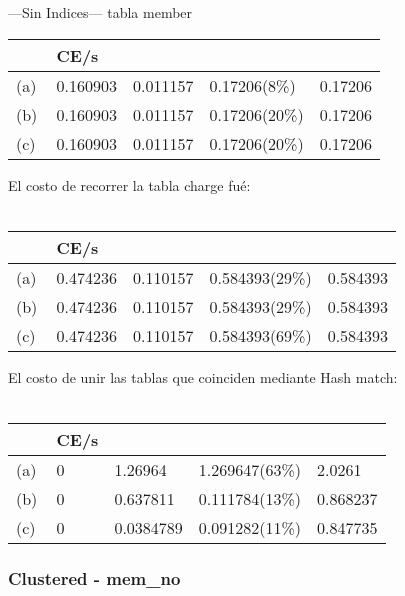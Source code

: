  ---Sin Indices---
 tabla member
\begin{tabular}{| L | L | L | L | L |}
    \hline
     & CE/s &  &  &  \\ \hline
    (a) & 0.160903 & 0.011157 & 0.17206(8\%) & 0.17206 \\ \hline
    (b) & 0.160903 & 0.011157 & 0.17206(20\%) & 0.17206 \\ \hline
    (c) & 0.160903 & 0.011157 & 0.17206(20\%) & 0.17206 \\ \hline
\end{tabular}

El costo de recorrer la tabla charge fué: \\ \\

\begin{tabular}{| L | L | L | L | L |}
    \hline
     & CE/s &  &  &  \\ \hline
    (a) & 0.474236 & 0.110157 & 0.584393(29\%) & 0.584393 \\ \hline
    (b) & 0.474236 & 0.110157 & 0.584393(29\%) & 0.584393 \\ \hline
    (c) & 0.474236 & 0.110157 & 0.584393(69\%) & 0.584393 \\ \hline
\end{tabular}

El costo de unir las tablas que coinciden mediante Hash match: \\ \\

\begin{tabular}{| L | L | L | L | L |}
    \hline
     & CE/s &  &  &  \\ \hline
    (a) & 0 & 1.26964 & 1.269647(63\%) & 2.0261 \\ \hline
    (b) & 0 & 0.637811 & 0.111784(13\%) & 0.868237 \\ \hline
    (c) & 0 & 0.0384789 & 0.091282(11\%) & 0.847735 \\ \hline
\end{tabular}




\subsubsection{Clustered - mem\_no}

